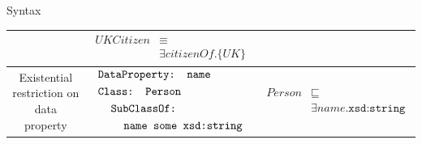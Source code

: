 \documentclass{beamer}
\newcommand\owlIndent{\hspace{4mm}}
\begin{document}
{\begin{block}{Syntax}
\begin{table}
\begin{center}
\begin{small}
\begin{tabular}{|c|c|c|}
\begin{minipage}{5cm}
						\end{minipage}	
						& 
						\begin{minipage}{4cm}
							$\begin{aligned}
								UKCitizen &\equiv\\
								 &\exists citizenOf.\{UK\}
							\end{aligned}$				
						\end{minipage}																		
						\\
						\hline	
						\begin{minipage}{1.5cm}
							Existential restriction on data property
						\end{minipage}
						& 
						\begin{minipage}{5cm}
							$\begin{aligned}
								&\texttt{DataProperty: name}\\
								&\texttt{Class: Person}\\
								&\owlIndent\texttt{SubClassOf:} \\
								&\owlIndent\owlIndent\texttt{name some xsd:string}
							\end{aligned}$
						\end{minipage}	
						& 
						\begin{minipage}{4cm}
							$\begin{aligned}
								Person &\sqsubseteq \\
								& \exists name.\texttt{xsd:string} 
							\end{aligned}$				
						\end{minipage}																		
						\\
						\hline															 				  
					\end{tabular}
				\end{small}
			\end{center}
		\end{table}
	\end{block}
}

\end{document}
